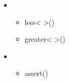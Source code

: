\documentclass[letterpaper,10pt,english]{sphinxmanual}
\begin{document}
\begin{itemize}
\begin{itemize}
\end{itemize}

\item {} 
\begin{itemize}
\item {} 
less\textless{}  \textgreater{}()

\item {} 
greater\textless{}  \textgreater{}()

\end{itemize}

\item {} 
\begin{itemize}
\item {} 
assert()

\end{itemize}

\end{itemize}
\end{document}
